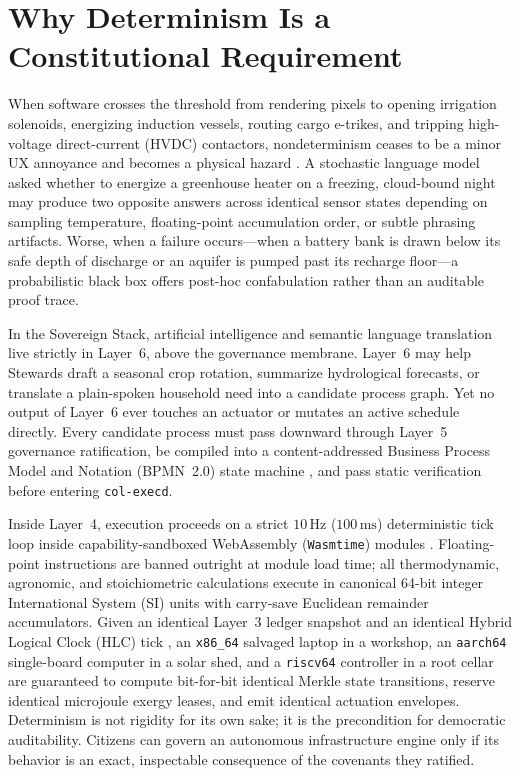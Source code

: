 \section*{Why Determinism Is a Constitutional Requirement}

When software crosses the threshold from rendering pixels to opening irrigation solenoids,
energizing induction vessels, routing cargo e-trikes, and tripping high-voltage
direct-current (HVDC) contactors, nondeterminism ceases to be a minor UX annoyance and
becomes a physical hazard \parencite{iec61508}. A stochastic language model asked whether to
energize a greenhouse heater on a freezing, cloud-bound night may produce two opposite
answers across identical sensor states depending on sampling temperature, floating-point
accumulation order, or subtle phrasing artifacts. Worse, when a failure occurs---when a
battery bank is drawn below its safe depth of discharge or an aquifer is pumped past its
recharge floor---a probabilistic black box offers post-hoc confabulation rather than an
auditable proof trace.

In the Sovereign Stack, artificial intelligence and semantic language translation live
strictly in Layer~6, above the governance membrane. Layer~6 may help Stewards draft a
seasonal crop rotation, summarize hydrological forecasts, or translate a plain-spoken
household need into a candidate process graph. Yet no output of Layer~6 ever touches an
actuator or mutates an active schedule directly. Every candidate process must pass downward
through Layer~5 governance ratification, be compiled into a content-addressed Business
Process Model and Notation (BPMN~2.0) state machine \parencite{omg2011bpmn}, and pass static
verification before entering \texttt{col-execd}.

Inside Layer~4, execution proceeds on a strict $10\,\mathrm{Hz}$ ($100\,\mathrm{ms}$)
deterministic tick loop inside capability-sandboxed WebAssembly (\texttt{Wasmtime}) modules
\parencite{haas2017wasm,miller2006robust}. Floating-point instructions are banned outright
at module load time; all thermodynamic, agronomic, and stoichiometric calculations execute
in canonical 64-bit integer International System (SI) units with carry-save Euclidean
remainder accumulators. Given an identical Layer~3 ledger snapshot and an identical Hybrid
Logical Clock (HLC) tick \parencite{kulkarni2014logical}, an \texttt{x86\_64} salvaged
laptop in a workshop, an \texttt{aarch64} single-board computer in a solar shed, and a
\texttt{riscv64} controller in a root cellar are guaranteed to compute bit-for-bit identical
Merkle state transitions, reserve identical microjoule exergy leases, and emit identical
actuation envelopes. Determinism is not rigidity for its own sake; it is the precondition
for democratic auditability. Citizens can govern an autonomous infrastructure engine only if
its behavior is an exact, inspectable consequence of the covenants they ratified.

